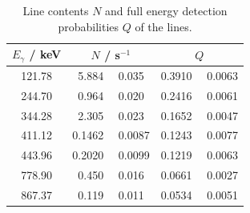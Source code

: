 \begin{table}[H]
	\centering
	\caption{Line contents $N$ and full energy detection probabilities $Q$ of the  lines.}
	\label{tab:eu_Q}
	\begin{tabular}{c  c  c}
		\toprule
		$E_\gamma$ / keV & $N$ / s$^{-1}$ & $Q$\\
		\midrule
		121.78 & 5.884  \, \clap{$\pm$} \,  0.035 & 0.3910  \, \clap{$\pm$} \,  0.0063 \\
		 244.70 & 0.964  \, \clap{$\pm$} \,  0.020 & 0.2416  \, \clap{$\pm$} \,  0.0061 \\
		 344.28 & 2.305  \, \clap{$\pm$} \,  0.023 & 0.1652  \, \clap{$\pm$} \,  0.0047 \\
		 411.12 & 0.1462  \, \clap{$\pm$} \,  0.0087 & 0.1243  \, \clap{$\pm$} \,  0.0077 \\
		 443.96 & 0.2020  \, \clap{$\pm$} \,  0.0099 & 0.1219  \, \clap{$\pm$} \,  0.0063 \\
		 778.90 & 0.450  \, \clap{$\pm$} \,  0.016 & 0.0661  \, \clap{$\pm$} \,  0.0027 \\
		 867.37 & 0.119  \, \clap{$\pm$} \,  0.011 & 0.0534  \, \clap{$\pm$} \,  0.0051 \\
		 \bottomrule
	\end{tabular}
\end{table}
